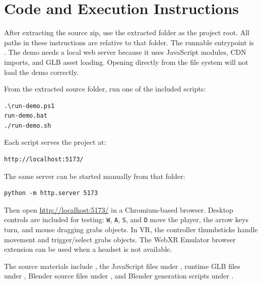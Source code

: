 \documentclass[conference]{IEEEtran}
\begin{document}
\section{Code and Execution Instructions}

After extracting the source zip, use the extracted folder as the project root.
All paths in these instructions are relative to that folder. The runnable
entrypoint is . The demo needs a local web server because it
uses JavaScript modules, CDN imports, and GLB asset loading. Opening
 directly from the file system will not load the demo
correctly.

From the extracted source folder, run one of the included scripts:

\begin{verbatim}
.\run-demo.ps1
run-demo.bat
./run-demo.sh
\end{verbatim}

Each script serves the project at:

\begin{verbatim}
http://localhost:5173/
\end{verbatim}

The same server can be started manually from that folder:

\begin{verbatim}
python -m http.server 5173
\end{verbatim}

Then open \url{http://localhost:5173/} in a Chromium-based browser. Desktop
controls are included for testing: \texttt{W}, \texttt{A}, \texttt{S}, and
\texttt{D} move the player, the arrow keys turn, and mouse dragging grabs
objects. In VR, the controller thumbsticks handle movement and trigger/select
grabs objects. The WebXR Emulator browser extension can be used when a headset
is not available.

The source materials include , the JavaScript files under
, runtime GLB files under , Blender source
files under , and Blender generation scripts under
.

\nocite{three,webxr,cannon,blender}


\end{document}

